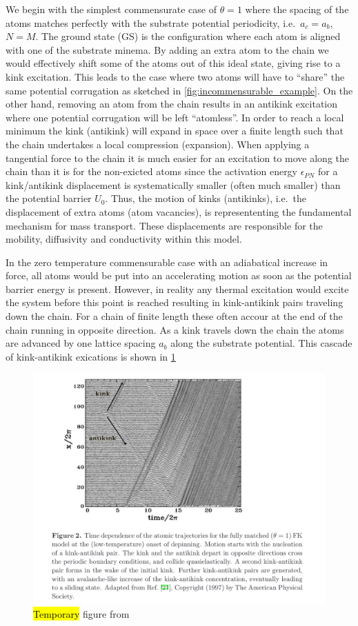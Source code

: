 We begin with the simplest commensurate case of $\theta = 1$ where the spacing
of the atoms matches perfectly with the substrate potential periodicity, i.e.\
$a_c = a_b$, $N = M$. The ground state (\acrshort{GS}) is the configuration where each atom
is aligned with one of the substrate minema. By adding an extra atom to the chain we would effectively shift some of the atoms out of this ideal state, giving rise to a kink excitation. This leads to the case where two atoms will have to ``share'' the same potential corrugation as sketched in \cref{fig:incommensurable_example}.  On the
other hand, removing an atom from the chain results in an antikink excitation
where one potential corrugation will be left ``atomless''. In order to reach a
local minimum the kink (antikink) will expand in space over a finite length such
that the chain undertakes a local compression (expansion). When applying a
tangential force to the chain it is much easier for an excitation to move along
the chain than it is for the non-exicted atoms since the activation energy
$\epsilon_{PN}$ for a kink/antikink displacement is systematically smaller
(often much smaller) than the potential barrier $U_0$. Thus, the motion of kinks
(antikinks), i.e.\ the displacement of extra atoms (atom vacancies), is
represententing the fundamental mechanism for mass transport. These
displacements are responsible for the mobility, diffusivity and conductivity
within this model. 

In the zero temperature commensurable case with an adiabatical increase in force, all atoms would be put into an accelerating motion as soon as the potential barrier energy is present. However, in reality any thermal excitation would excite the system before this point is reached resulting in kink-antikink pairs traveling down the chain. For a chain of finite length these often accour at the end of the chain running in opposite direction. As a kink travels down the chain the atoms are advanced by one lattice spacing $a_b$ along the substrate potential. This cascade of kink-antikink exications is shown in \cref{fig:kink_antikink}

\begin{figure}[H]
  \centering
  \includegraphics[width=0.8\linewidth]{figures/theory/kink_antikink.png}
  \caption{\hl{Temporary} figure from \cite{Manini_2016}}
  \label{fig:kink_antikink}
\end{figure}

